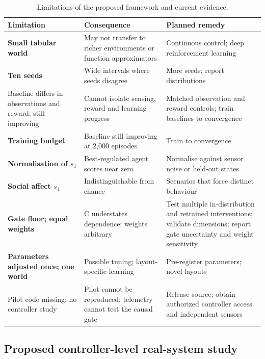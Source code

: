 \documentclass[twoside,11pt]{article}
\begin{document}
\begin{table}[!htbp]
\centering
\caption{Limitations of the proposed framework and current evidence.}\label{tab:10}
\small
\renewcommand{\arraystretch}{1.2}
\begin{tabular}{>{\raggedright\arraybackslash}p{\dimexpr 0.2548\dimexpr\textwidth-6\tabcolsep\relax\relax}>{\raggedright\arraybackslash}p{\dimexpr 0.4099\dimexpr\textwidth-6\tabcolsep\relax\relax}>{\raggedright\arraybackslash}p{\dimexpr 0.3353\dimexpr\textwidth-6\tabcolsep\relax\relax}}
\toprule
\textbf{Limitation} & \textbf{Consequence} & \textbf{Planned remedy} \\
\midrule
\textbf{Small tabular world} & May not transfer to richer environments or function approximators & Continuous control; deep reinforcement learning \\
\textbf{Ten seeds} & Wide intervals where seeds disagree & More seeds; report distributions \\
Baseline differs in observations and reward; still improving & Cannot isolate sensing, reward and learning progress & Matched observation and reward controls; train baselines to convergence \\
\textbf{Training budget} & Baseline still improving at 2,000 episodes & Train to convergence \\
\textbf{Normalisation of $s_{1}$} & Best-regulated agent scores near zero & Normalise against sensor noise or held-out states \\
\textbf{Social affect $s_{4}$} & Indistinguishable from chance & Scenarios that force distinct behaviour \\
\textbf{Gate floor; equal weights} & C understates dependence; weights arbitrary & Test multiple in-distribution and retrained interventions; validate dimensions; report gate uncertainty and weight sensitivity \\
\textbf{Parameters adjusted once; one world} & Possible tuning; layout-specific learning & Pre-register parameters; novel layouts \\
Pilot code missing; no controller study & Pilot cannot be reproduced; telemetry cannot test the causal gate & Release source; obtain authorized controller access and independent sensors \\
\bottomrule
\end{tabular}
\end{table}

\subsection{Proposed controller-level real-system study}\label{sec:9.1}
\end{document}
